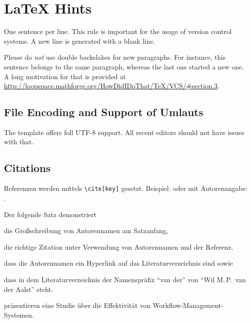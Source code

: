 
\chapter{LaTeX Hints}
\label{chap:latexhints}

One sentence per line.
This rule is important for the usage of version control systems.
A new line is generated with a blank line.

Please do \textit{not} use double backslahes for new paragraphs.
For instance, this sentence belongs to the same paragraph, whereas the last one started a new one.
A long motivation for that is provided at \url{http://loopspace.mathforge.org/HowDidIDoThat/TeX/VCS/#section.3}.

\section{File Encoding and Support of Umlauts}
\label{sec:firstsectioninlatexhints}
The template offers foll UTF-8 support.
All recent editors should not have issues with that.

\section{Citations}
Referenzen werden mittels \texttt{\textbackslash cite[key]} gesetzt.
Beispiel: \cite{WSPA} oder mit Autorenangabe: \citet{WSPA}.

Der folgende Satz demonstriert \begin{inparaenum}[1.]
  \item die Großschreibung von Autorennamen am Satzanfang,
  \item die richtige Zitation unter Verwendung von Autorennamen und der Referenz,
  \item dass die Autorennamen ein Hyperlink auf das Literaturverzeichnis sind sowie
  \item dass in dem Literaturverzeichnis der Namenspräfix \enquote{van der} von \enquote{Wil M.\,P.\ van der Aalst} steht.
\end{inparaenum}
 präsentieren eine Studie über die Effektivität von Workflow-Management-Systemen.

